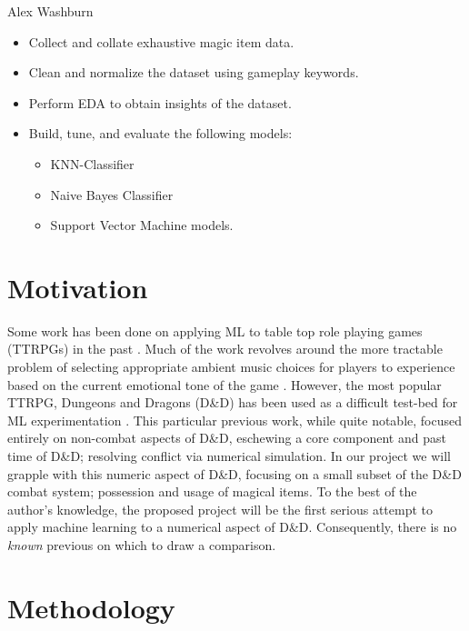 \documentclass[12pt]{diazessay}
\begin{document}
Alex Washburn

\begin{itemize}

	\item Collect and collate exhaustive magic item data.
	\item Clean and normalize the dataset using gameplay keywords.
	\item Perform EDA to obtain insights of the dataset.
	\item Build, tune, and evaluate the following models:
	\begin{itemize}
		\item KNN-Classifier
		\item Naive Bayes Classifier
		\item Support Vector Machine models.
	\end{itemize}

\end{itemize}

\clearpage


\section*{Motivation}

Some work has been done on applying ML to table top role playing games (TTRPGs) in the past \cite{rameshkumar-bailey-2020-storytelling, macinnes2019d, cavanaugh2016machine, faria2019adaptive, riedl2013interactive}.
Much of the work revolves around the more tractable problem of selecting appropriate ambient music choices for players to experience based on the current emotional tone of the game \cite{ferreira2017mtg, risi2020increasing, padovani2017bardo, ferreira2020computer}.
However, the most popular TTRPG, Dungeons and Dragons (D\&D) has been used as a difficult test-bed for ML experimentation \cite{martin2018dungeons}.
This particular previous work, while quite notable, focused entirely on non-combat aspects of D\&D, eschewing a core component and past time of D\&D; resolving conflict via numerical simulation.
In our project we will grapple with this numeric aspect of D\&D, focusing on a small subset of the D\&D combat system; possession and usage of magical items.
To the best of the author's knowledge, the proposed project will be the first serious attempt to apply machine learning to a numerical aspect of D\&D.
Consequently, there is no \emph{known} previous on which to draw a comparison.


\section*{Methodology}
\end{document}
